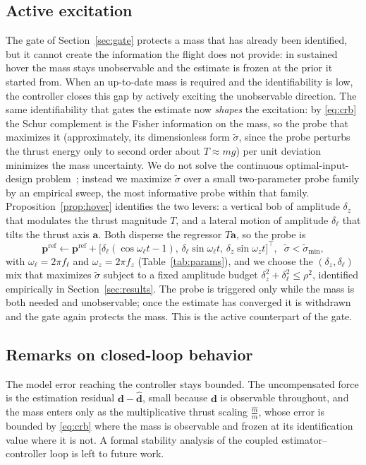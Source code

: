 \documentclass[lettersize,journal]{IEEEtran}
\newcommand{\vect}[1]{\bm{#1}}
\begin{document}
\subsection{Active excitation}\label{sec:active}
The gate of Section~\ref{sec:gate} protects a mass that has already been
identified, but it cannot create the information the flight does not provide:
in sustained hover the mass stays unobservable and the estimate is frozen at
the prior it started from. When an up-to-date mass is required and the
identifiability is low, the controller closes this gap by actively exciting the
unobservable direction. The same identifiability that gates the estimate now
\emph{shapes} the excitation: by \eqref{eq:crb} the Schur complement is the Fisher
information on the mass, so the probe that maximizes it (approximately, its
dimensionless form $\tilde\sigma$, since the probe perturbs the thrust energy
only to second order about $T\approx mg$) per unit deviation
minimizes the mass uncertainty. We do not solve the continuous
optimal-input-design problem~\cite{mehra1974optimal}; instead we maximize
$\tilde\sigma$ over a small two-parameter probe family by an empirical sweep, the
most informative probe within that family. Proposition~\ref{prop:hover}
identifies the two levers: a vertical bob of amplitude $\delta_z$ that modulates the
thrust magnitude $T$, and a lateral motion of amplitude $\delta_\ell$ that tilts the
thrust axis $\vect{a}$. Both disperse the regressor $T\vect{a}$, so the probe is
\begin{equation}
\vect{p}^{\text{ref}}\!\leftarrow\!\vect{p}^{\text{ref}}\!+\!
\big[\delta_\ell(\cos\omega_\ell t\!-\!1),\,\delta_\ell\sin\omega_\ell t,\,\delta_z\sin\omega_z t\big]^{\!\top},
\;\; \tilde\sigma<\tilde\sigma_{\min},
\label{eq:probe}
\end{equation}
with $\omega_\ell=2\pi f_\ell$ and $\omega_z=2\pi f_z$ (Table~\ref{tab:params}),
and we choose the $(\delta_z,\delta_\ell)$ mix that maximizes $\tilde\sigma$ subject to a
fixed amplitude budget $\delta_z^2+\delta_\ell^2\le\rho^2$, identified empirically in
Section~\ref{sec:results}. The
probe is triggered only while the mass is both needed and unobservable; once the
estimate has converged it is withdrawn and the gate again protects the mass. This
is the active counterpart of the gate.

\subsection{Remarks on closed-loop behavior}
The model error reaching the controller stays bounded. The uncompensated force is
the estimation residual $\vect{d}-\hat{\vect{d}}$, small because $\vect{d}$ is
observable throughout, and the mass enters only as the multiplicative thrust
scaling $\tfrac{\hat m}{m}$, whose error is bounded by \eqref{eq:crb} where the mass is
observable and frozen at its identification value where it is not. A formal
stability analysis of the coupled estimator--controller loop is left to future
work.
\end{document}
